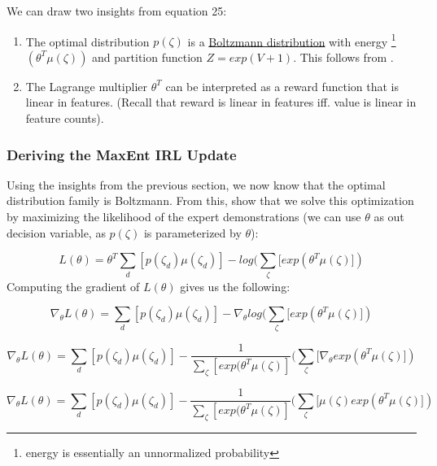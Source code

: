 \documentclass[11pt]{article}
\begin{document}
We can draw two insights from equation 25:
\begin{enumerate}
    \item The optimal distribution $p(\zeta)$ is a \underline{Boltzmann distribution} with energy \footnote{energy is essentially an unnormalized probability} $(\theta^T \mu(\zeta))$ and partition function $Z = exp(V + 1)$. This follows from \cite{jaynes1957information}.
    
    \item The Lagrange multiplier $\theta^T$ can be interpreted as a reward function that is linear in features. (Recall that reward is linear in features iff. value is linear in feature counts).
\end{enumerate}

\subsubsection{Deriving the MaxEnt IRL Update}
Using the insights from the previous section, we now know that the optimal distribution family is Boltzmann. From this, \cite{jaynes1957information} show that we solve this optimization by maximizing the likelihood of the expert demonstrations (we can use $\theta$ as out decision variable, as $p(\zeta)$ is parameterized by $\theta$):

\begin{equation}
    L(\theta) = \theta^T \sum_d [p(\zeta_d) \mu(\zeta_d)] - log(\sum_\zeta [exp(\theta^T \mu(\zeta)])
\end{equation}
Computing the gradient of $L(\theta)$ gives us the following:

\begin{equation}
    \nabla_\theta L(\theta) = \sum_d [p(\zeta_d) \mu(\zeta_d)] - \nabla_\theta log(\sum_\zeta [exp(\theta^T \mu(\zeta)])
\end{equation}

\begin{equation}
    \nabla_\theta L(\theta) = \sum_d [p(\zeta_d) \mu(\zeta_d)] - \frac{1}{\sum_\zeta [exp(\theta^T \mu(\zeta)]} (\sum_\zeta [ \nabla_\theta exp(\theta^T \mu(\zeta)])
\end{equation}

\begin{equation}
    \nabla_\theta L(\theta) = \sum_d [p(\zeta_d) \mu(\zeta_d)] - \frac{1}{\sum_\zeta [exp(\theta^T \mu(\zeta)]} (\sum_\zeta [\mu(\zeta) exp(\theta^T \mu(\zeta)])
\end{equation}
\end{document}
